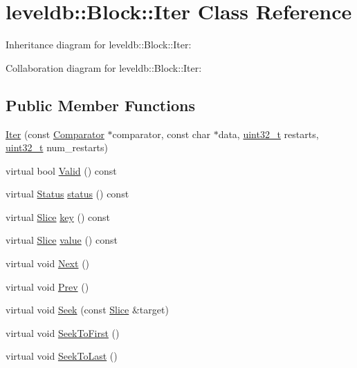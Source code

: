 \hypertarget{classleveldb_1_1_block_1_1_iter}{\section{leveldb\-:\-:Block\-:\-:Iter Class Reference}
\label{classleveldb_1_1_block_1_1_iter}
}


Inheritance diagram for leveldb\-:\-:Block\-:\-:Iter\-:


Collaboration diagram for leveldb\-:\-:Block\-:\-:Iter\-:
\subsection*{Public Member Functions}
\begin{DoxyCompactItemize}
\item 
\hyperlink{classleveldb_1_1_block_1_1_iter_a31b124ec1fc5750b31b182dc44282588}{Iter} (const \hyperlink{structleveldb_1_1_comparator}{Comparator} $\ast$comparator, const char $\ast$data, \hyperlink{stdint_8h_a435d1572bf3f880d55459d9805097f62}{uint32\-\_\-t} restarts, \hyperlink{stdint_8h_a435d1572bf3f880d55459d9805097f62}{uint32\-\_\-t} num\-\_\-restarts)
\item 
virtual bool \hyperlink{classleveldb_1_1_block_1_1_iter_ac4be155bfc93e1d2b90cfd670f22c1ba}{Valid} () const 
\item 
virtual \hyperlink{classleveldb_1_1_status}{Status} \hyperlink{classleveldb_1_1_block_1_1_iter_a39f400b72dc79931145600a702b71c61}{status} () const 
\item 
virtual \hyperlink{classleveldb_1_1_slice}{Slice} \hyperlink{classleveldb_1_1_block_1_1_iter_a1378d5e1fb17638427fd0a0f7fc7a010}{key} () const 
\item 
virtual \hyperlink{classleveldb_1_1_slice}{Slice} \hyperlink{classleveldb_1_1_block_1_1_iter_afb28e69efec54ca9306fc504e139bf3f}{value} () const 
\item 
virtual void \hyperlink{classleveldb_1_1_block_1_1_iter_a27dacbefa903333a5ad003ccd3e424b6}{Next} ()
\item 
virtual void \hyperlink{classleveldb_1_1_block_1_1_iter_a096747ff77d5090579fe4cd4e464a3c9}{Prev} ()
\item 
virtual void \hyperlink{classleveldb_1_1_block_1_1_iter_a3dcefc0609937b33c046ac7fafb52ad7}{Seek} (const \hyperlink{classleveldb_1_1_slice}{Slice} \&target)
\item 
virtual void \hyperlink{classleveldb_1_1_block_1_1_iter_aecc19bb6d8a219e7fb8e695fb5b57bd3}{Seek\-To\-First} ()
\item 
virtual void \hyperlink{classleveldb_1_1_block_1_1_iter_a3007d98d17a03138c629fc2b2eb56204}{Seek\-To\-Last} ()
\end{DoxyCompactItemize}
